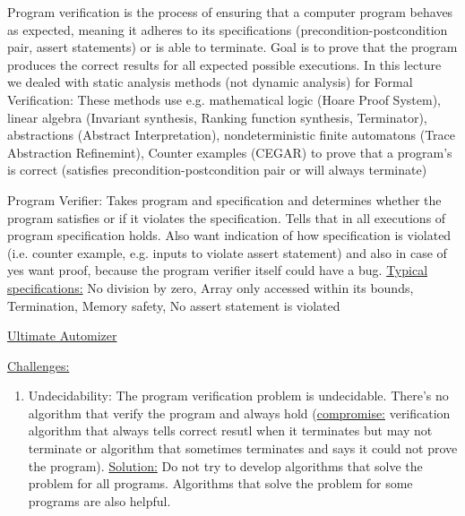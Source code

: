 \documentclass[landscape, a4paper]{article}
\begin{document}
\fontsize{3pt}{3pt}\selectfont

\begin{minipage}[t]{0.2\linewidth}
	  
	\begin{betterlist}
		\item Program verification is the process of ensuring that a computer program behaves as expected, meaning it adheres to its specifications (precondition-postcondition pair, assert statements) or is able to terminate. Goal is to prove that the program produces the correct results for all expected possible executions. In this lecture we dealed with static analysis methods (not dynamic analysis) for Formal Verification: These methods use e.g. mathematical logic (Hoare Proof System), linear algebra (Invariant synthesis, Ranking function synthesis, Terminator), \alert{abstractions (Abstract Interpretation)}, \alert{nondeterministic finite automatons (Trace Abstraction Refinemint)}, \alert{Counter examples (CEGAR)} to prove that a program's is correct (satisfies precondition-postcondition pair or will always terminate)
		\item \alert{Program Verifier:} Takes program and specification and determines whether the program satisfies or if it violates the specification. Tells that in all executions of program specification holds. Also want indication of how specification is violated (i.e. counter example, e.g. inputs to violate assert statement) and also in case of yes want proof, because the program verifier itself could have a bug. \underline{Typical specifications:} No division by zero, Array only accessed within its bounds, Termination, Memory safety, No assert statement is violated
		\item \href{https://ultimate-pa.org/?ui=tool&tool=automizer}{Ultimate Automizer}
		\item \underline{Challenges:}
		\begin{enumerate}
			\item \alert{Undecidability:} The program verification problem is undecidable. There's no algorithm that verify the program and always hold (\underline{compromise:} verification algorithm that always tells correct resutl when it terminates but may not terminate or algorithm that sometimes terminates and says it could not prove the program). \underline{Solution:} Do not try to develop algorithms that solve the problem for all programs. Algorithms that solve the problem for some programs are also helpful.

\end{enumerate}
\end{betterlist}
\end{minipage}
\end{document}
